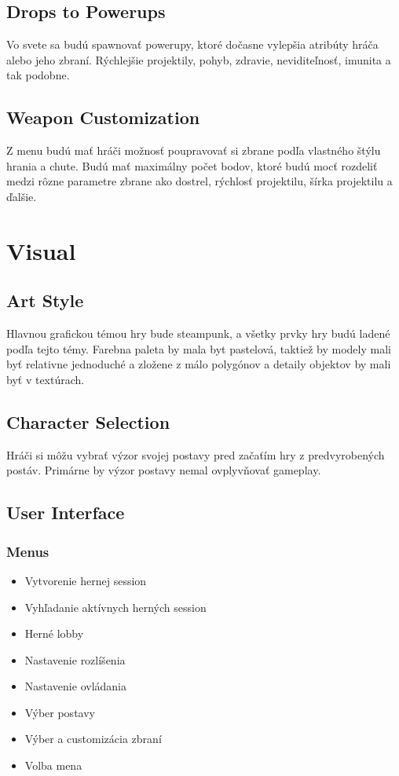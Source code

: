\documentclass[a4paper]{report}
\begin{document}
\section{Drops to Powerups}
Vo svete sa budú spawnovať powerupy, ktoré dočasne vylepšia atribúty hráča alebo jeho zbraní. Rýchlejšie projektily, pohyb, zdravie, neviditeľnosť, imunita a tak podobne.

\section{Weapon Customization}
Z menu budú mať hráči možnosť poupravovať si zbrane podľa vlastného štýlu hrania a chute. Budú mať maximálny počet bodov, ktoré budú mocť rozdeliť medzi rôzne parametre zbrane ako dostrel, rýchlosť projektilu, šírka projektilu a ďalšie.
 
\chapter{Visual}
\section{Art Style}
Hlavnou grafickou témou hry bude steampunk, a všetky prvky hry budú ladené podľa tejto témy. Farebna paleta by mala byt pastelová, taktiež by modely mali byť relativne jednoduché a zložene z málo polygónov a detaily objektov by mali byť v textúrach.

\section{Character Selection}
 Hráči si môžu vybrať výzor svojej postavy pred začaťím hry z predvyrobených postáv. Primárne by výzor postavy nemal ovplyvňovať gameplay.

\section{User Interface}
\subsection{Menus}
\begin{itemize}
  \item Vytvorenie hernej session
  \item Vyhľadanie aktívnych herných session
  \item Herné lobby
  \item Nastavenie rozlíšenia
  \item Nastavenie ovládania
  \item Výber postavy
  \item Výber a customizácia zbraní
  \item Volba mena
\end{itemize}
 
\end{document}
